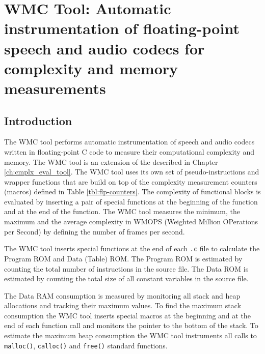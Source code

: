 % 
\chapter{WMC Tool: Automatic instrumentation of floating-point speech
         and audio codecs for complexity and memory measurements}

\section{Introduction}

The WMC tool performs automatic instrumentation of speech and audio codecs written in floating-point C code to measure their computational complexity and memory. The WMC tool is an extension of the  described in Chapter \ref{ch:cmplx_eval_tool}. The WMC tool uses its own set of pseudo-instructions and wrapper functions that are build on top of the complexity measurement counters (macros) defined in Table \ref{tbl:flp-counters}. The complexity of functional blocks is evaluated by inserting a pair of special functions at the beginning of the function and at the end of the function. The WMC tool measures the minimum, the maximum and the average complexity in WMOPS (Weighted Million OPerations per Second) by defining the number of frames per second.

The WMC tool inserts special functions at the end of each \verb|.c| file to calculate the Program ROM and Data (Table) ROM. The Program ROM is estimated by counting the total number of instructions in the source file. The Data ROM is estimated by counting the total size of all constant variables in the source file.

The Data RAM consumption is measured by monitoring all stack and heap allocations and tracking their maximum values. To find the maximum stack consumption the WMC tool inserts special macros at the beginning and at the end of each function call and monitors the pointer to the bottom of the stack. To estimate the maximum heap consumption the WMC tool instruments all calls to \verb|malloc()|, \verb|calloc()| and \verb|free()| standard functions.

